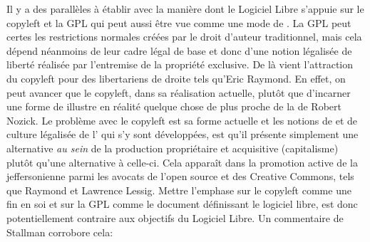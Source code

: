 {


Il y a des parall\`eles \`a \'etablir avec la mani\`ere dont le Logiciel
Libre s'appuie sur le copyleft et la GPL qui peut aussi \^etre vue
comme une mode de . La GPL
peut certes  les restrictions normales cr\'e\'ees par le
droit d'auteur traditionnel, mais cela d\'epend
n\'eanmoins de leur cadre l\'egal de base et donc d'une notion
l\'egalis\'ee de libert\'e r\'ealis\'ee par l'entremise de la
propri\'et\'e exclusive. De l\`a vient l'attraction du copyleft pour
des libertariens de droite tels qu'Eric Raymond. En effet, on peut
avancer que le copyleft, dans sa r\'ealisation actuelle, plut\^ot que
d'incarner une forme de  illustre en r\'ealit\'e
quelque chose de plus proche de la  de Robert
Nozick. Le probl\`eme avec le copyleft est sa forme actuelle et les
notions de  et de culture l\'egalis\'ee de l' 
qui s'y sont d\'evelopp\'ees, est qu'il pr\'esente simplement une
alternative {\em au sein} de la production propri\'etaire et
acquisitive (capitalisme) plut\^ot qu'une alternative \`a celle{}-ci.
Cela appara\^it dans la promotion active de la 
jeffersonienne parmi les avocats de l'open source et des Creative
Commons, tels que Raymond et Lawrence Lessig. Mettre l'emphase sur le
copyleft comme une fin en soi et sur la GPL comme le document
d\'efinissant le logiciel libre, est donc potentiellement contraire aux
objectifs du Logiciel Libre. Un commentaire de Stallman corrobore cela:


}
